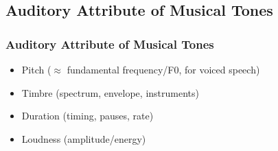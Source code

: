 \documentclass{beamer}
\begin{document}
\subsection{Auditory Attribute of Musical Tones} 
\begin{frame}
\frametitle{Auditory Attribute of Musical Tones}
\begin{itemize}
\item{Pitch ($\approx$ fundamental frequency/F0, for voiced speech)}



\item{Timbre (spectrum, envelope, instruments)}

\item{Duration (timing, pauses, rate)}
\item{Loudness (amplitude/energy)}
\end{itemize}
\end{frame}

\end{document}
